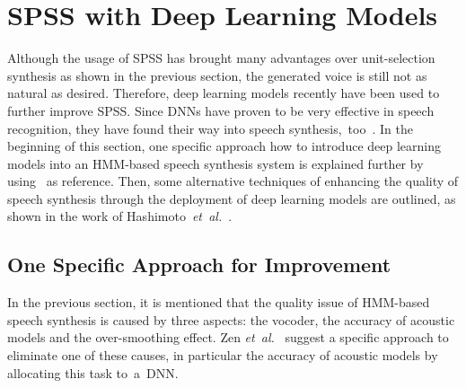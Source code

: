 
\section{\ac{SPSS} with Deep Learning Models}
\label{sec:deepspeech}

Although the usage of \ac{SPSS} has brought many advantages over unit-selection synthesis as shown in the previous section, the generated voice is still not as natural as desired. Therefore, deep learning models recently have been used to further improve \ac{SPSS}. Since \acfp{DNN} have proven to be very effective in speech recognition, they have found their way into speech synthesis,~too~\cite{hashimoto:effect}. %
In the beginning of this section, one specific approach how to introduce deep learning models into an \ac{HMM}-based speech synthesis system is explained further by using~\cite{zen:deepstatistical} as reference. Then, some alternative techniques of enhancing the quality of speech synthesis through the deployment of deep learning models are outlined, as shown in the work of Hashimoto~\textit{et~al.}~\cite{hashimoto:effect}.

\subsection{One Specific Approach for Improvement}
\label{subsec:deepspss}

In the previous section, it is mentioned that the quality issue of \ac{HMM}-based speech synthesis is caused by three aspects: the vocoder, the accuracy of acoustic models and the over-smoothing effect. Zen \textit{et~al.}~\cite{zen:deepstatistical} suggest a specific approach to eliminate one of these causes, in particular the accuracy of acoustic models by allocating this task to~a~\ac{DNN}. 

